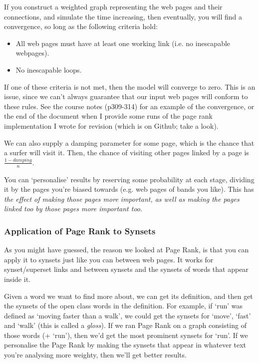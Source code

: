 If you construct a weighted graph representing the web pages and their
connections, and simulate the time increasing, then eventually, you will find a
convergence, so long as the following criteria hold:

\begin{itemize}
  \item All web pages must have at least one working link (i.e. no inescapable
    webpages).
  \item No inescapable loops.
\end{itemize}

If one of these criteria is not met, then the model will converge to zero. This
is an issue, since we can't always guarantee that our input web pages will
conform to these rules. See the course notes (p309-314) for an example of the
convergence, or the end of the document when I provide some runs of the page
rank implementation I wrote for revision (which is on Github; take a look).

We can also supply a damping parameter for some page, which is the chance that a
surfer will visit it. Then, the chance of visiting other pages linked by a page
is $\frac{1 - damping}{n}$.

You can `personalise' results by reserving some probability at each stage,
dividing it by the pages you're biased towards (e.g. web pages of bands you
like). This has \textit{the effect of making those pages more important, as well
as making the pages linked too by those pages more important too}.

\subsubsection{Application of Page Rank to Synsets}

As you might have guessed, the reason we looked at Page Rank, is that you can
apply it to synsets just like you can between web pages. It works for
synset/superset links and between synsets and the synsets of words that appear
inside it.

Given a word we want to find more about, we can get its definition, and then get
the synsets of the open class words in the definition. For example, if `run' was
defined as `moving faster than a walk', we could get the synsets for `move',
`fast' and `walk' (this is called a \textit{gloss}). If we ran Page Rank on a
graph consisting of those words (+ `run'), then we'd get the most prominent
synsets for `run'. If we personalise the Page Rank by making the synsets that
appear in whatever text you're analysing more weighty, then we'll get better
results.

